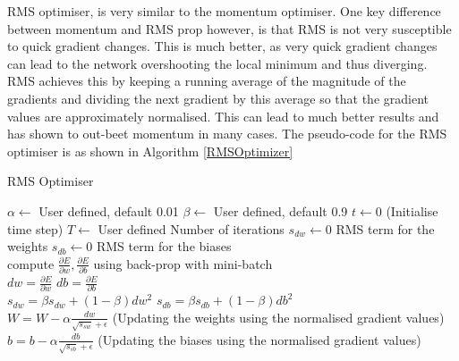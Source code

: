  \label{SRMS}
RMS optimiser, is very similar to the momentum optimiser. One key difference between momentum and RMS prop however, is that RMS is not very susceptible to quick gradient changes. This is much better, as very quick gradient changes can lead to the network overshooting the local minimum and thus diverging. RMS achieves this by keeping a running average of the magnitude of the gradients and dividing the next gradient by this average so that the gradient values are approximately normalised. This can lead to much better results and has shown to out-beet momentum in many cases. The pseudo-code for the RMS optimiser is as shown in Algorithm \ref{RMSOptimizer}

\begin{algorithm}[H]
\caption{RMS Optimiser}\label{RMSOptimizer}
\begin{algorithmic}[1]
\State $\alpha \gets$ User defined, default 0.01
\State $\beta \gets$ User defined, default 0.9
\State $t \gets 0$ (Initialise time step)
\State $T \gets$ User defined Number of iterations 
\State $s_{dw} \gets 0$ RMS term for the weights
\State $s_{db} \gets 0$ RMS term for the biases
\\
\State compute $\frac{\partial E}{\partial w}, \frac{\partial E}{\partial b}$ using back-prop with mini-batch
\\
\State $dw = \frac{\partial E}{\partial w}$
\State $db = \frac{\partial E}{\partial b}$
\\
\State $s_{dw} = \beta s_{dw}  + (1-\beta)dw^2$
\State $s_{db} = \beta s_{db}  + (1-\beta)db^2$
\\
\State $W = W-\alpha \frac{dw}{\sqrt{s_{sw}} + \epsilon}$ (Updating the weights using the normalised gradient values)
\State $b = b-\alpha \frac{db}{\sqrt{s_{sb}} + \epsilon}$ (Updating the biases using the normalised gradient values)
\EndFor
\EndFor
\end{algorithmic}
\end{algorithm}